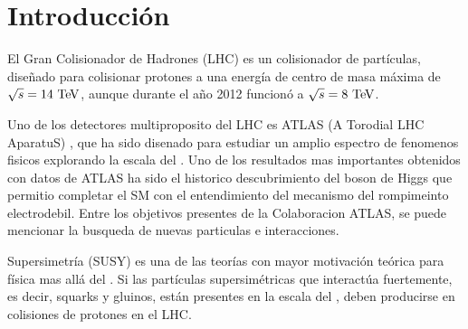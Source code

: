 \chapter*{Introducción}

El Gran Colisionador de Hadrones (LHC) \cite{Evans:1129806} es un colisionador
de partículas, diseñado para colisionar protones a una energía de centro de masa
máxima de $\sqrt{s} = 14 \tev$, aunque durante el a\~no 2012 funcionó a $\sqrt{s}=8\tev$.

Uno de los detectores multiproposito del LHC es ATLAS (A Torodial LHC AparatuS)
\cite{atlas}, que ha sido disenado para estudiar un amplio espectro de fenomenos
fisicos explorando la escala del {\tev}. Uno de los resultados mas importantes obtenidos
con datos de ATLAS ha sido el historico descubrimiento del boson de Higgs\cite{Aad:2012tfa}
que permitio completar el SM con el entendimiento del mecanismo del rompimeinto
electrodebil. Entre los objetivos presentes de la Colaboracion ATLAS, se puede mencionar
la busqueda de nuevas particulas e interacciones.

Supersimetría (SUSY) \cite{Miyazawa:1966,Ramond:1971gb,Golfand:1971iw,Neveu:1971rx,Neveu:1971iv,Gervais:1971ji,Volkov:1973ix,Wess:1973kz,Wess:1974tw}
es una de las teorías con mayor motivación teórica para
física mas allá del {\SM}. Si las partículas supersimétricas que interactúa
fuertemente, es decir, squarks y gluinos, están presentes en la escala del {\tev},
deben producirse en colisiones de protones en el LHC.



